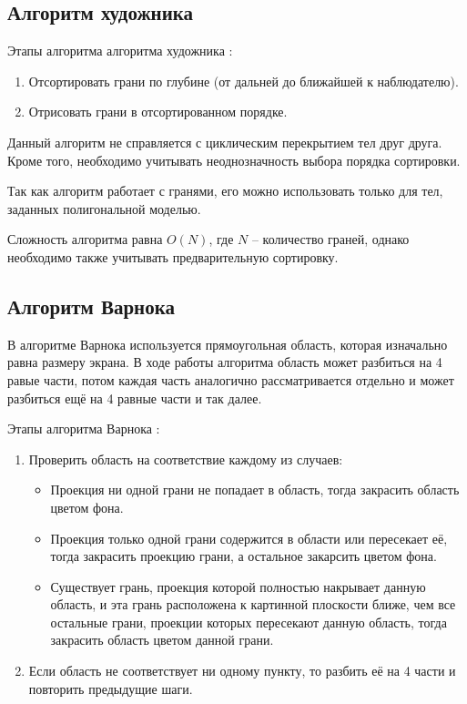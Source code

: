 \subsection{Алгоритм художника}

Этапы алгоритма алгоритма художника \cite{tomsk_2011}:

\begin{enumerate}[label=\arabic*)]
    \item Отсортировать грани по глубине (от дальней до ближайшей к наблюдателю). 
    \item Отрисовать грани в отсортированном порядке.
\end{enumerate}

Данный алгоритм не справляется с циклическим перекрытием тел друг друга. Кроме того, необходимо учитывать неоднозначность выбора порядка сортировки.

Так как алгоритм работает с гранями, его можно использовать только для тел, заданных полигональной моделью.

Сложность алгоритма равна $O(N)$, где $N$ -- количество граней, однако необходимо также учитывать предварительную сортировку.


\subsection{Алгоритм Варнока}

В алгоритме Варнока используется прямоугольная область, которая изначально равна размеру экрана. В ходе работы алгоритма область может разбиться на 4 равые части, потом каждая часть аналогично рассматривается отдельно и может разбиться ещё на 4 равные части и так далее.

Этапы алгоритма Варнока \cite{warnock1969hidden}:

\begin{enumerate}[label=\arabic*)]
    \item Проверить область на соответствие каждому из случаев:
    \begin{itemize}[label=---]
        \item Проекция ни одной грани не попадает в область, тогда закрасить область цветом фона.
        \item Проекция только одной грани содержится в области или пересекает её, тогда закрасить проекцию грани, а остальное закарсить цветом фона.
        \item Существует грань, проекция которой полностью накрывает данную область, и эта грань расположена к картинной плоскости ближе, чем все остальные грани, проекции которых пересекают данную область, тогда закрасить область цветом данной грани.
    \end{itemize}
    \item Если область не соответствует ни одному пункту, то разбить её на 4 части и повторить предыдущие шаги.
\end{enumerate}

